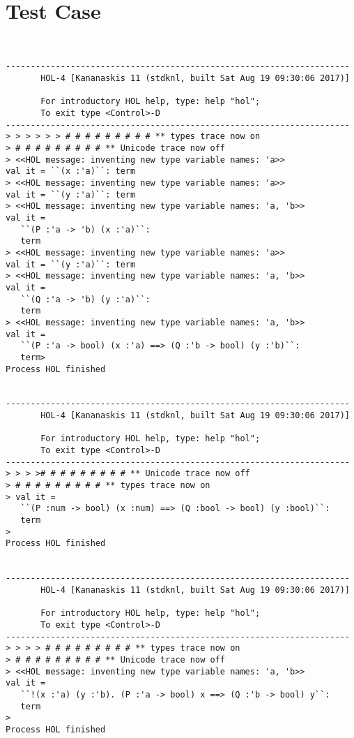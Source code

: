 \documentclass{report}
\begin{document}
\section{Test Case}
\label{test-results-6.2.1}

\begin{session}
  \begin{scriptsize}
\begin{verbatim}


---------------------------------------------------------------------
       HOL-4 [Kananaskis 11 (stdknl, built Sat Aug 19 09:30:06 2017)]

       For introductory HOL help, type: help "hol";
       To exit type <Control>-D
---------------------------------------------------------------------
> > > > > > # # # # # # # # # ** types trace now on
> # # # # # # # # # ** Unicode trace now off
> <<HOL message: inventing new type variable names: 'a>>
val it = ``(x :'a)``: term
> <<HOL message: inventing new type variable names: 'a>>
val it = ``(y :'a)``: term
> <<HOL message: inventing new type variable names: 'a, 'b>>
val it =
   ``(P :'a -> 'b) (x :'a)``:
   term
> <<HOL message: inventing new type variable names: 'a>>
val it = ``(y :'a)``: term
> <<HOL message: inventing new type variable names: 'a, 'b>>
val it =
   ``(Q :'a -> 'b) (y :'a)``:
   term
> <<HOL message: inventing new type variable names: 'a, 'b>>
val it =
   ``(P :'a -> bool) (x :'a) ==> (Q :'b -> bool) (y :'b)``:
   term> 
Process HOL finished


---------------------------------------------------------------------
       HOL-4 [Kananaskis 11 (stdknl, built Sat Aug 19 09:30:06 2017)]

       For introductory HOL help, type: help "hol";
       To exit type <Control>-D
---------------------------------------------------------------------
> > > ># # # # # # # # # ** Unicode trace now off
> # # # # # # # # # ** types trace now on
> val it =
   ``(P :num -> bool) (x :num) ==> (Q :bool -> bool) (y :bool)``:
   term
> 
Process HOL finished


---------------------------------------------------------------------
       HOL-4 [Kananaskis 11 (stdknl, built Sat Aug 19 09:30:06 2017)]

       For introductory HOL help, type: help "hol";
       To exit type <Control>-D
---------------------------------------------------------------------
> > > > # # # # # # # # # ** types trace now on
> # # # # # # # # # ** Unicode trace now off
> <<HOL message: inventing new type variable names: 'a, 'b>>
val it =
   ``!(x :'a) (y :'b). (P :'a -> bool) x ==> (Q :'b -> bool) y``:
   term
> 
Process HOL finished



\end{verbatim}
\end{scriptsize}
\end{session}
\end{document}
